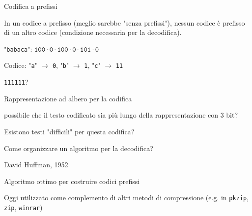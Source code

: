 \begin{frame}{Codifica a prefissi}

\vspace{-9pt}
\begin{myboxtitle}
In un codice a prefisso (meglio sarebbe "senza prefissi"), \alert{nessun codice è
prefisso di un altro codice} (condizione necessaria per la decodifica).
\end{myboxtitle}

\begin{myboxtitle}[Esempio 1]
\BI
\item "\texttt{babaca}": $\texttt{100} \cdot \texttt{0} \cdot \texttt{100} \cdot \texttt{0} \cdot \texttt{101} \cdot \texttt{0}$
\EI
\end{myboxtitle}

\begin{myboxtitle}[Esempio 2]
\BI
\item Codice: "\texttt{a}" $\rightarrow$ \texttt{0}, "\texttt{b}" $\rightarrow$ \texttt{1}, "\texttt{c}" $\rightarrow$ \texttt{11}
\item \texttt{111111}?
\EI
\end{myboxtitle}

\end{frame}


\begin{frame}{Rappresentazione ad albero per la codifica}

\vspace{-9pt}
\begin{myboxtitle}
\BIL
\item \EE possibile che il testo codificato sia più lungo della rappresentazione con 3 bit?
\item Esistono testi "difficili" per questa codifica?
\item Come organizzare un algoritmo per la decodifica?
\EIL
\end{myboxtitle}

\begin{myboxtitle}
\BIL
\item David Huffman, 1952
\item Algoritmo ottimo per costruire codici prefissi
\item Oggi utilizzato come complemento di altri metodi di compressione
(e.g. in \texttt{pkzip}, \texttt{zip}, \texttt{winrar})
\EIL
\end{myboxtitle}

\end{frame}

